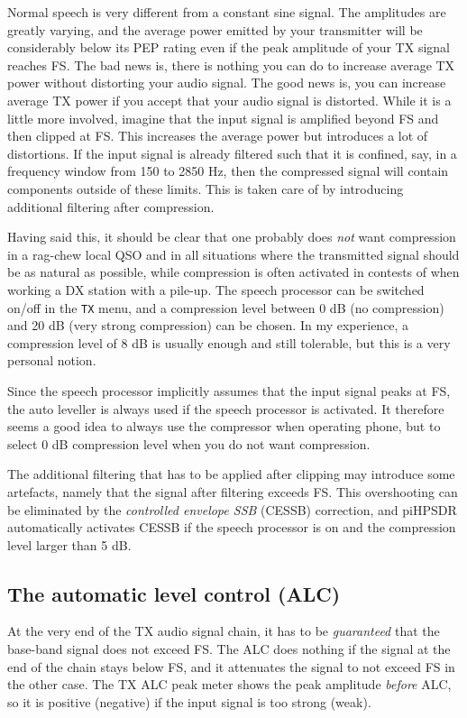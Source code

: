 \documentclass[12pt]{book}
\def\bltt#1{\texttt{\color{blue}#1}}
\def\pH{pi\-HPSDR\xspace}
\begin{document}
Normal speech is very different from a constant sine signal. The amplitudes are greatly varying, and
the average power emitted by your transmitter will be considerably below its PEP rating even if the
peak amplitude of your TX signal reaches FS. The bad news is, there is nothing you can do to increase
average TX power without distorting your audio signal. The good news is, you can increase average TX
power if you accept that your audio signal is distorted. While it is a little more involved, imagine
that the input signal is amplified beyond FS and then clipped at FS. This increases the average power
but introduces a lot of distortions. If the input signal is already filtered such that it is confined,
say, in a frequency window from 150 to 2850 Hz, then the compressed signal will contain components outside
of these limits. This is taken care of by introducing additional filtering after compression.

Having said this, it should be clear that one probably does \textit{not} want compression in a rag-chew
local QSO and in all situations where the transmitted signal should be as natural as possible, while
compression is often activated in contests of when working a DX station with a pile-up. The
speech processor can be switched on/off in the \bltt{TX} menu, and a compression level between 0 dB
(no compression) and 20 dB (very strong compression) can be chosen. In my  experience, a compression
level of 8 dB is usually enough and still tolerable, but this is a very personal notion.

Since the speech processor implicitly assumes that the input signal peaks at FS, the auto leveller is
always used if the speech processor is activated. It therefore seems a good idea to always use the
compressor when operating phone, but to select 0 dB compression level when you do not want compression.

The additional filtering that has to be applied after clipping may introduce some artefacts, namely
that the signal after filtering exceeds FS. This overshooting can be eliminated by the
\textit{controlled envelope SSB} (CESSB) correction, and \pH automatically activates CESSB if the
speech processor is on and the compression level larger than 5 dB.

\subsection{The automatic level control (ALC)}

At the very end of the TX audio signal chain, it has to be \textit{guaranteed} that the base-band
signal does not exceed FS. The ALC does nothing if the signal at the end of the chain stays below FS,
and it attenuates the signal to not exceed FS in the other case. The TX ALC peak meter shows the
peak amplitude \textit{before} ALC, so it is positive (negative) if the input signal is too strong
(weak).
\end{document}
